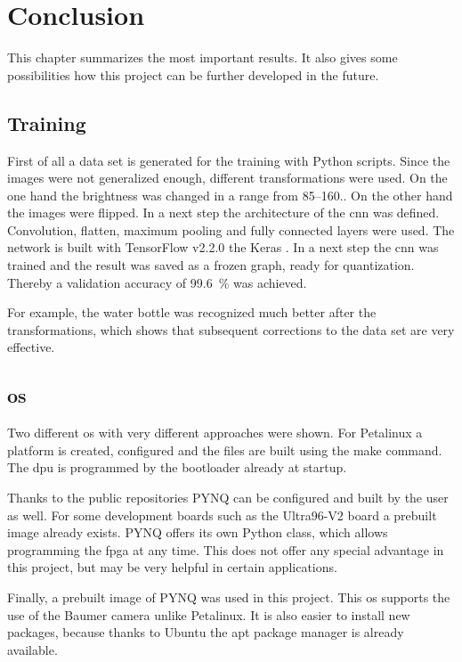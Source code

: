 \chapter{Conclusion}
\label{ch:conclusion}
This chapter summarizes the most important results.
It also gives some possibilities how this project can be further developed in the future.

\section{Training}
\label{sec:conclusion:training}
First of all a data set is generated for the training with Python scripts.
Since the images were not generalized enough, different transformations were used.
On the one hand the brightness was changed in a range from \numrange{85}{160}..
On the other hand the images were flipped.
In a next step the architecture of the \acrshort{cnn} was defined.
Convolution, flatten, maximum pooling and fully connected layers were used.
The network is built with TensorFlow v2.2.0 the Keras .
In a next step the \acrshort{cnn} was trained and the result was saved as a frozen graph, ready for quantization.
Thereby a validation accuracy of \SI{99.6}{\%} was achieved.

For example, the water bottle was recognized much better after the transformations, which shows that subsequent corrections to the data set are very effective. 

\section{\Acrlong{os}}
\label{sec:conclusion:os}
Two different \acrshort{os} with very different approaches were shown.
For Petalinux a platform is created, configured and the files are built using the make command.
The \acrshort{dpu} is programmed by the bootloader already at startup.

Thanks to the public repositories PYNQ can be configured and built by the user as well.
For some development boards such as the Ultra96-V2 board a prebuilt image already exists.
PYNQ offers its own Python class, which allows programming the \acrshort{fpga} at any time.
This does not offer any special advantage in this project, but may be very helpful in certain applications.

Finally, a prebuilt image of PYNQ was used in this project.
This \acrlong{os} supports the use of the Baumer camera unlike Petalinux.
It is also easier to install new packages, because thanks to Ubuntu the apt package manager is already available.

